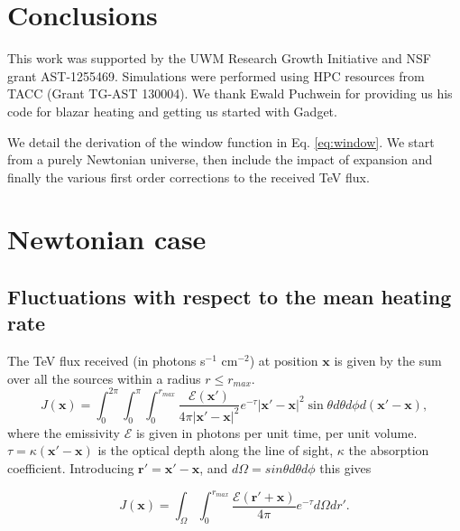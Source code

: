 \documentclass[twocolumns]{emulateapj}
\begin{document}
\section{Conclusions}


\begin{acknowledgements}
This work was supported by the UWM Research Growth Initiative and NSF grant AST-1255469. Simulations were performed using HPC resources from TACC (Grant TG-AST 130004). We thank Ewald Puchwein for providing us his code for blazar heating and getting us started with Gadget. 
\end{acknowledgements}


\appendix

We detail the derivation of the window function in Eq. \ref{eq:window}. We start from a purely Newtonian universe, then include the impact of expansion and finally the various first order corrections to the received TeV flux.
\section {Newtonian case}\label{sec:windon_newt}

\subsection {Fluctuations with respect to the mean heating rate}

The TeV flux received (in photons s$^{-1}$ cm$^{-2}$) at position $\mathbf{x}$ is given by the sum over all the sources within a radius $r\leqslant r_{max}$.
\begin{equation}
  \label{eq:flux_recu0}
  J(\mathbf{x})=\int_{0}^{2\pi}\int_{0}^{\pi}\int_0^{r_{max}}   \frac{\mathcal{E}(\mathbf{x}') }{4\pi |\mathbf{x}'-\mathbf{x}|^2} e^{-\tau} |\mathbf{x}'-\mathbf{x}|^2 \sin\theta d\theta d\phi d(\mathbf{x}'-\mathbf{x}),
\end{equation}
where the emissivity $\mathcal{E}$ is given in photons per unit time, per unit volume. $\tau=\kappa (\mathbf{x}'-\mathbf{x})$ is the optical depth along the line of sight, $\kappa$ the absorption coefficient.
Introducing $\mathbf{r'}=\mathbf{x}'-\mathbf{x}$, and $d\Omega=sin\theta d\theta d\phi$ this gives


\begin{equation}
  \label{eq:flux_recu}
  J(\mathbf{x})=\int_{\Omega}\int_0^{r_{max}}   \frac{\mathcal{E}(\mathbf{r}'+\mathbf{x}) }{4\pi } e^{-\tau} d\Omega dr'.
\end{equation}
\end{document}
